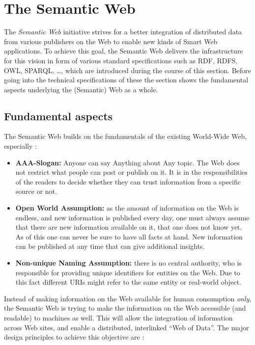 
\section{The Semantic Web}
\label{sec:semantic_web}

The \emph{Semantic Web} initiative strives for a better integration of distributed data from various publishers on the Web to enable new kinds of Smart Web applications. To achieve this goal, the Semantic Web delivers the infrastructure for this vision in form of various standard specifications such as \gls{RDF}, \gls{RDFS}, \gls{OWL}, \gls{SPARQL}, \ldots, which are introduced during the course of this section. Before going into the technical specifications of these the section shows the fundamental aspects underlying the (Semantic) Web as a whole.

\subsection{Fundamental aspects}
\label{subsec:fundamentals_semweb}

The Semantic Web builds on the fundamentals of the existing World-Wide Web, especially \citep[pg. 4-11]{allemang2011semantic}: \@

\begin{itemize}
	\item \textbf{AAA-Slogan:} Anyone can say Anything about Any topic. The Web does not restrict what people can post or publish on it. It is in the responsibilities of the readers to decide whether they can trust information from a specific source or not.
	\item \textbf{Open World Assumption:} as the amount of information on the Web is endless, and new information is published every day, one must always assume that there are new information available on it, that one does not know yet. As of this one can never be sure to have all facts at hand. New information can be published at any time that can give additional insights.
	\item \textbf{Non-unique Naming Assumption:} there is no central authority, who is responsible for providing unique identifiers for entities on the Web. Due to this fact different \gls{URI}s might refer to the same entity or real-world object.
\end{itemize}

Instead of making information on the Web available for human consumption \emph{only}, the Semantic Web is trying to make the information on the Web accessible (and readable) to machines as well. This will allow the integration of information across Web sites, and enable a distributed, interlinked ``Web of Data''. The major design principles to achieve this objective are \citep[pg. 1-22]{antoniou2008semantic}: \@

